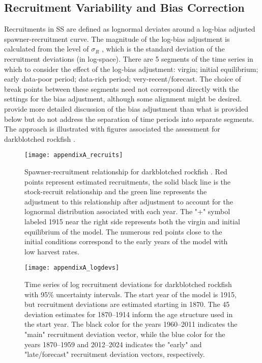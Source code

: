 \subsection{Recruitment Variability and Bias Correction }
\hypertarget{BiasCorrect}{}

Recruitments in SS are defined as lognormal deviates around a log-bias adjusted spawner-recruitment curve.  The magnitude of the log-bias adjustment is calculated from the level of $\sigma_R$ , which is the standard deviation of the recruitment deviations (in log-space).  There are 5 segments of the time series in which to consider the effect of the log-bias adjustment: virgin; initial equilibrium; early data-poor period; data-rich period; very-recent/forecast. The choice of break points between these segments need not correspond directly with the settings for the bias adjustment, although some alignment might be desired. \citet{methot-adjusting-2011} provide more detailed discussion of the bias adjustment than what is provided below but do not address the separation of time periods into separate segments. The approach is illustrated with figures associated the assessment for darkblotched rockfish \citep{gertseva-status-2013}.

\begin{figure}[H]
	\begin{center}
		\texttt{[image: appendixA\_recruits]}\\
	\end{center}	

	\caption{ Spawner-recruitment relationship for darkblotched rockfish \citep{gertseva-status-2013}. Red points represent estimated recruitments, the solid black line is the stock-recruit relationship and the green line represents the adjustment to this relationship after adjustment to account for the lognormal distribution associated with each year. The "+" symbol labeled 1915 near the right side represents both the virgin and initial equilibrium of the model. The numerous red points close to the initial conditions correspond to the early years of the model with low harvest rates.}
	\label{fig:recruits}	
\end{figure}

\begin{figure}[H]
	\begin{center}
		\texttt{[image: appendixA\_logdevs]}\\
	\end{center}
\caption{ Time series of log recruitment deviations for darkblotched rockfish with 95\% uncertainty intervals. The start year of the model is 1915, but recruitment deviations are estimated starting in 1870. The 45 deviation estimates for 1870–1914 inform the age structure used in the start year. The black color for the years 1960–2011 indicates the "main" recruitment deviation vector, while the blue color for the years 1870–1959 and 2012–2024 indicates the "early" and "late/forecast" recruitment deviation vectors, respectively.}
\label{fig:recdevs}
\end{figure}

